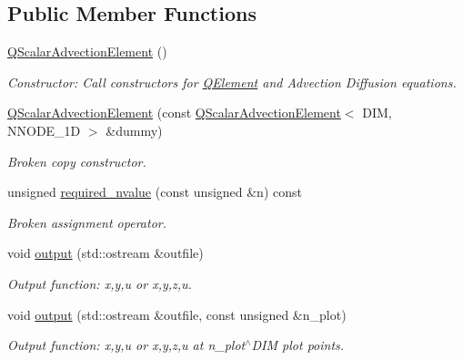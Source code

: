 \subsection*{Public Member Functions}
\begin{DoxyCompactItemize}
\item 
\hyperlink{classoomph_1_1QScalarAdvectionElement_ad460805f1986b3984355da7e0d4fd2fc}{Q\+Scalar\+Advection\+Element} ()
\begin{DoxyCompactList}\small\item\em Constructor\+: Call constructors for \hyperlink{classoomph_1_1QElement}{Q\+Element} and Advection Diffusion equations. \end{DoxyCompactList}\item 
\hyperlink{classoomph_1_1QScalarAdvectionElement_acb0db915bd078a2cf8170e1dcb598754}{Q\+Scalar\+Advection\+Element} (const \hyperlink{classoomph_1_1QScalarAdvectionElement}{Q\+Scalar\+Advection\+Element}$<$ D\+IM, N\+N\+O\+D\+E\+\_\+1D $>$ \&dummy)
\begin{DoxyCompactList}\small\item\em Broken copy constructor. \end{DoxyCompactList}\item 
unsigned \hyperlink{classoomph_1_1QScalarAdvectionElement_a967897f5171c0b1e03a1f85d40025959}{required\+\_\+nvalue} (const unsigned \&n) const
\begin{DoxyCompactList}\small\item\em Broken assignment operator. \end{DoxyCompactList}\item 
void \hyperlink{classoomph_1_1QScalarAdvectionElement_aeb9bb432fb1662b65e05ffd5a2ac8693}{output} (std\+::ostream \&outfile)
\begin{DoxyCompactList}\small\item\em Output function\+: x,y,u or x,y,z,u. \end{DoxyCompactList}\item 
void \hyperlink{classoomph_1_1QScalarAdvectionElement_a1e964b1183bd25bcd9a55c7e6997a4c1}{output} (std\+::ostream \&outfile, const unsigned \&n\+\_\+plot)
\begin{DoxyCompactList}\small\item\em Output function\+: x,y,u or x,y,z,u at n\+\_\+plot$^\wedge$\+D\+IM plot points. \end{DoxyCompactList}\end{DoxyCompactItemize}
